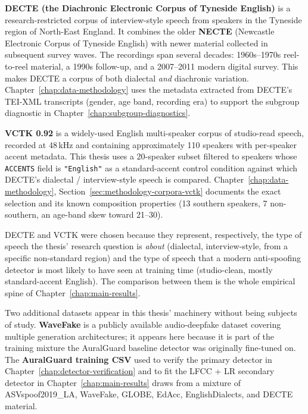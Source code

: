 \textbf{DECTE (the Diachronic Electronic Corpus of Tyneside
English)} \cite{Corrigan_DECTE} is a research-restricted corpus
of interview-style speech from speakers in the Tyneside region
of North-East England. It combines the older \textbf{NECTE}
(Newcastle Electronic Corpus of Tyneside English)
\cite{Allen2007_NECTE} with newer material collected in
subsequent survey waves. The recordings span several decades:
1960s--1970s reel-to-reel material, a 1990s follow-up, and a
2007--2011 modern digital survey. This makes DECTE a corpus of
both dialectal \emph{and} diachronic variation.
Chapter~\ref{chap:data-methodology} uses the metadata extracted
from DECTE's TEI-XML transcripts (gender, age band, recording
era) to support the subgroup diagnostic in
Chapter~\ref{chap:subgroup-diagnostics}.

\textbf{VCTK 0.92} \cite{Veaux2017_VCTK} is a widely-used English
multi-speaker corpus of studio-read speech, recorded at 48\,kHz
and containing approximately 110 speakers with per-speaker
accent metadata. This thesis uses a 20-speaker subset filtered
to speakers whose \texttt{ACCENTS} field is \texttt{"English"} as
a standard-accent control condition against which DECTE's
dialectal / interview-style speech is compared.
Chapter~\ref{chap:data-methodology},
Section~\ref{sec:methodology-corpora-vctk} documents the exact
selection and its known composition properties (13 southern
speakers, 7 non-southern, an age-band skew toward 21--30).

DECTE and VCTK were chosen because they represent, respectively,
the type of speech the thesis' research question is \emph{about}
(dialectal, interview-style, from a specific non-standard region)
and the type of speech that a modern anti-spoofing detector is
most likely to have seen at training time (studio-clean, mostly
standard-accent English). The comparison between them is the
whole empirical spine of Chapter~\ref{chap:main-results}.

Two additional datasets appear in this thesis' machinery without
being subjects of study. \textbf{WaveFake}
\cite{Frank2021_WaveFake} is a publicly available audio-deepfake
dataset covering multiple generation architectures; it appears
here because it is part of the training mixture the AuralGuard
baseline detector was originally fine-tuned on. The
\textbf{AuralGuard training CSV} used to verify the primary
detector in Chapter~\ref{chap:detector-verification} and to fit
the LFCC + LR secondary detector in
Chapter~\ref{chap:main-results} draws from a mixture of
ASVspoof2019\_LA, WaveFake, GLOBE, EdAcc, EnglishDialects, and
DECTE material.


